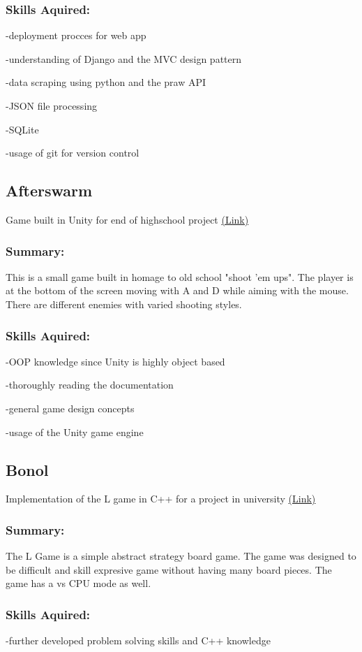 \documentclass[a4paper,hidelinks,10pt]{article}
\begin{document}
\subsubsection{Skills Aquired:}

-deployment procces for web app

-understanding of Django and the MVC design pattern

-data scraping using python and the praw API

-JSON file processing

-SQLite

-usage of git for version control

\subsection{Afterswarm}
Game built in Unity for end of highschool project \href{https://mega.nz/#F!e7hGCa6A!YFMBrU9kS6GqHZPJJb20WA}{(Link)}
\subsubsection{Summary:}
This is a small game built in homage to old school "shoot 'em ups". The player is at the bottom of the screen
moving with A and D while aiming with the mouse. There are different enemies with varied shooting styles.

\subsubsection{Skills Aquired:}
-OOP knowledge since Unity is highly object based

-thoroughly reading the documentation

-general game design concepts

-usage of the Unity game engine

\subsection{Bonol}
Implementation of the L game in C++ for a project in university \href{https://github.com/IureaMarius/ProiectIP}{(Link)}
\subsubsection{Summary:}
The L Game is a simple abstract strategy board game. The game was designed to be difficult and skill expresive
game without having many board pieces. The game has a vs CPU mode as well.
\subsubsection{Skills Aquired:}
-further developed problem solving skills and C++ knowledge
\end{document}
